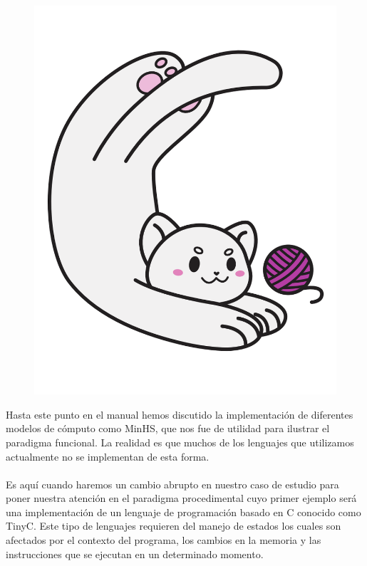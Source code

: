 
\begin{figure}[htbp]
    \centerline{\includegraphics[scale=.35]{assets/09_Gatito_C.png}}
\end{figure}

Hasta este punto en el manual hemos discutido la implementación de diferentes modelos de cómputo como \textsf{MinHS}, que nos fue de utilidad para ilustrar el paradigma funcional. La realidad es que muchos de los lenguajes que utilizamos actualmente no se implementan de esta forma.\\\\
Es aquí cuando haremos un cambio abrupto en nuestro caso de estudio para poner nuestra atención en el paradigma procedimental cuyo primer ejemplo será una implementación de un lenguaje de programación basado en \textsf{C} conocido como \textsf{TinyC}. Este tipo de lenguajes requieren del manejo de estados los cuales son afectados por el contexto del programa, los cambios en la memoria y las instrucciones que se ejecutan en un determinado momento.


